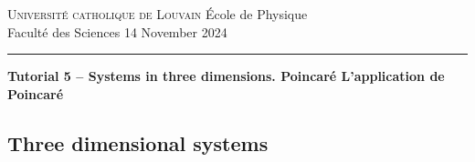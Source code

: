 \documentclass{article}
\begin{document}
\noindent
{\textsc{Universit\'e catholique de Louvain}} \hfill \'Ecole de Physique\\
Facult\'e des Sciences \hfill 14 November 2024\\
\hrule

\bigskip

\begin{center}
  \textbf{Tutorial 5 -- Systems in three dimensions. Poincar\'e L'application de Poincar\'e} 
\end{center}

{}


\subsection*{Three dimensional systems}
\end{document}
